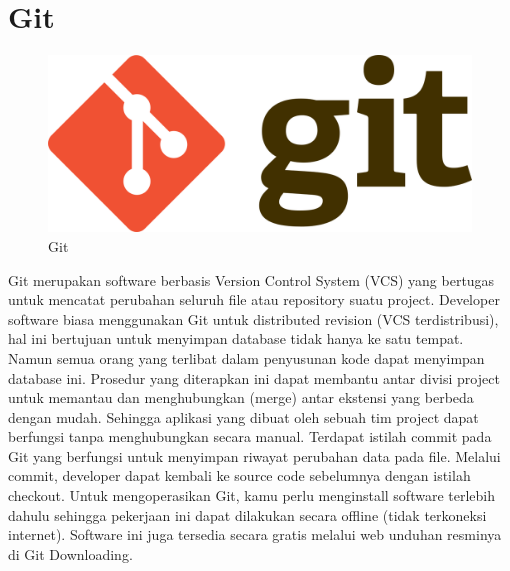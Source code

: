 \section{Git}
\begin{figure}[H]
        \centerline{\includegraphics[scale=0.15]{figures/git/git-logo}}
        \caption{Git}
\end{figure}
Git merupakan software berbasis Version Control System (VCS) yang bertugas untuk mencatat perubahan seluruh file atau repository suatu project. Developer software biasa menggunakan Git untuk distributed revision (VCS terdistribusi), hal ini bertujuan untuk menyimpan database tidak hanya ke satu tempat. Namun semua orang yang terlibat dalam penyusunan kode dapat menyimpan database ini. Prosedur yang diterapkan ini dapat membantu antar divisi project untuk memantau dan menghubungkan (merge) antar ekstensi yang berbeda dengan mudah. Sehingga aplikasi yang dibuat oleh sebuah tim project dapat berfungsi tanpa menghubungkan secara manual. Terdapat istilah commit pada Git yang berfungsi untuk menyimpan riwayat perubahan data pada file. Melalui commit, developer dapat kembali ke source code sebelumnya dengan istilah checkout. Untuk mengoperasikan Git, kamu perlu menginstall software terlebih dahulu sehingga pekerjaan ini dapat dilakukan secara offline (tidak terkoneksi internet). Software ini juga tersedia secara gratis melalui web unduhan resminya di Git Downloading.



